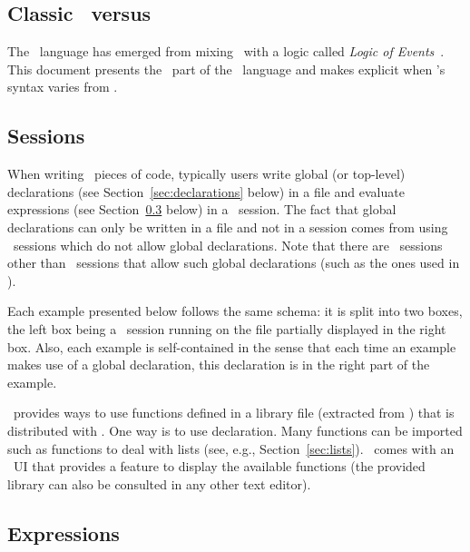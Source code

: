 \documentclass[11pt]{article}
\begin{document}
\subsection {Classic \ML\ versus \EML}

The \EML\ language has emerged from mixing \CML\ with a logic called
\emph{Logic of
  Events}~\cite{Bickford:2009,Bickford+Constable:2008,Bickford+Constable+Guaspari:2011a}.
This document presents the \ML\ part of the \EML\ language and makes
explicit when \EML's syntax varies from \CML.


\subsection {Sessions}

When writing \ML\ pieces of code, typically users write global (or
top-level) declarations (see Section~\ref{sec:declarations} below) in
a file and evaluate expressions (see Section~\ref{sec:expressions}
below) in a \ML\ session.  The fact that global declarations can only
be written in a file and not in a session comes from using
\EML\ sessions which do not allow global declarations.  Note that
there are \ML\ sessions other than \EML\ sessions that allow such
global declarations (such as the ones used in \Nuprl).

Each example presented below follows the same schema: it is split into
two boxes, the left box being a \ML\ session running on the file
partially displayed in the right box.  Also, each example is
self-contained in the sense that each time an example makes use of a
global declaration, this declaration is in the right part of the
example.

\EML\ provides ways to use functions defined in a library file
(extracted from \Nuprl) that is distributed with \EML.  One way is to
use  declaration.  Many functions can be imported such as
functions to deal with lists (see, e.g., Section~\ref{sec:lists}).
\EML\ comes with an \Emacs~UI that provides a feature to display the
available functions (the provided library can also be consulted in any
other text editor).


\subsection {Expressions}
\label{sec:expressions}
\end{document}
